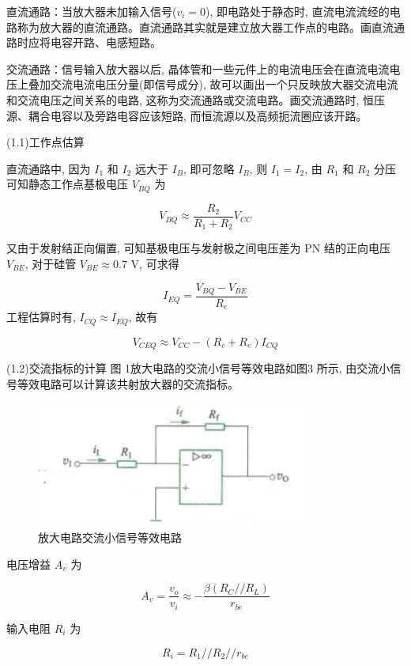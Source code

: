 \documentclass[10pt, a4paper]{article} %
\begin{document}
直流通路：当放大器未加输入信号($v_i = 0$), 即电路处于静态时, 直流电流流经的电路称为放大器的直流通路。直流通路其实就是建立放大器工作点的电路。画直流通路时应将电容开路、电感短路。

交流通路：信号输入放大器以后, 晶体管和一些元件上的电流电压会在直流电流电压上叠加交流电流电压分量(即信号成分), 故可以画出一个只反映放大器交流电流和交流电压之间关系的电路, 这称为交流通路或交流电路。画交流通路时, 恒压源、耦合电容以及旁路电容应该短路, 而恒流源以及高频扼流圈应该开路。


(1.1)工作点估算


直流通路中, 因为 $I_1$ 和 $I_2$ 远大于 $I_B$, 即可忽略 $I_B$, 则 $I_1 = I_2$, 由 $R_1$ 和 $R_2$ 分压可知静态工作点基极电压 $V_{BQ}$ 为

 $$
V_{BQ} \approx \frac{R_2}{R_1 + R_2} V_{CC}
$$ 

又由于发射结正向偏置, 可知基极电压与发射极之间电压差为 PN 结的正向电压 $V_{BE}$, 对于硅管 $V_{BE} \approx 0.7 \text{ V}$, 可求得

$$
I_{EQ} = \frac{V_{BQ} - V_{BE}}{R_e}
$$ 
工程估算时有, $I_{CQ} \approx I_{EQ}$, 故有

$$
V_{CEQ} \approx V_{CC} - (R_c + R_e) I_{CQ}
$$ 

(1.2)交流指标的计算
图 1放大电路的交流小信号等效电路如图3 所示, 由交流小信号等效电路可以计算该共射放大器的交流指标。

\begin{center}
\begin{figure}[ht]
    \centering
    \includegraphics[width=0.8\textwidth]{image/3.png} %
    \caption{放大电路交流小信号等效电路}
    \label{fig:small_signal}
\end{figure}
\end{center}

电压增益 $A_v$ 为

$$
A_v = \frac{v_o}{v_i} \approx -\frac{\beta (R_C // R_L)}{r_{be}}
$$ 

输入电阻 $R_i$ 为

$$
R_i = R_1 // R_2 // r_{be}
$$ 
\end{document}
